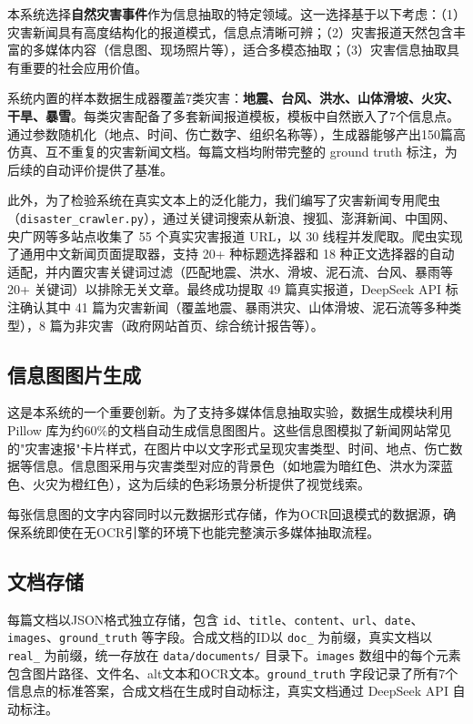 \documentclass[12pt, a4paper]{ctexart}
\begin{document}
本系统选择\textbf{自然灾害事件}作为信息抽取的特定领域。这一选择基于以下考虑：（1）灾害新闻具有高度结构化的报道模式，信息点清晰可辨；（2）灾害报道天然包含丰富的多媒体内容（信息图、现场照片等），适合多模态抽取；（3）灾害信息抽取具有重要的社会应用价值。

系统内置的样本数据生成器覆盖7类灾害：\textbf{地震、台风、洪水、山体滑坡、火灾、干旱、暴雪}。每类灾害配备了多套新闻报道模板，模板中自然嵌入了7个信息点。通过参数随机化（地点、时间、伤亡数字、组织名称等），生成器能够产出150篇高仿真、互不重复的灾害新闻文档。每篇文档均附带完整的 ground truth 标注，为后续的自动评价提供了基准。

此外，为了检验系统在真实文本上的泛化能力，我们编写了灾害新闻专用爬虫（\texttt{disaster\_crawler.py}），通过关键词搜索从新浪、搜狐、澎湃新闻、中国网、央广网等多站点收集了 55 个真实灾害报道 URL，以 30 线程并发爬取。爬虫实现了通用中文新闻页面提取器，支持 20+ 种标题选择器和 18 种正文选择器的自动适配，并内置灾害关键词过滤（匹配地震、洪水、滑坡、泥石流、台风、暴雨等 20+ 关键词）以排除无关文章。最终成功提取 49 篇真实报道，DeepSeek API 标注确认其中 41 篇为灾害新闻（覆盖地震、暴雨洪灾、山体滑坡、泥石流等多种类型），8 篇为非灾害（政府网站首页、综合统计报告等）。

\subsection{信息图图片生成}

这是本系统的一个重要创新。为了支持多媒体信息抽取实验，数据生成模块利用 Pillow 库为约60\%的文档自动生成信息图图片。这些信息图模拟了新闻网站常见的"灾害速报"卡片样式，在图片中以文字形式呈现灾害类型、时间、地点、伤亡数据等信息。信息图采用与灾害类型对应的背景色（如地震为暗红色、洪水为深蓝色、火灾为橙红色），这为后续的色彩场景分析提供了视觉线索。

每张信息图的文字内容同时以元数据形式存储，作为OCR回退模式的数据源，确保系统即使在无OCR引擎的环境下也能完整演示多媒体抽取流程。

\subsection{文档存储}

每篇文档以JSON格式独立存储，包含 \texttt{id}、\texttt{title}、\texttt{content}、\texttt{url}、\texttt{date}、\texttt{images}、\texttt{ground\_truth} 等字段。合成文档的ID以 \texttt{doc\_} 为前缀，真实文档以 \texttt{real\_} 为前缀，统一存放在 \texttt{data/documents/} 目录下。\texttt{images} 数组中的每个元素包含图片路径、文件名、alt文本和OCR文本。\texttt{ground\_truth} 字段记录了所有7个信息点的标准答案，合成文档在生成时自动标注，真实文档通过 DeepSeek API 自动标注。
\end{document}

